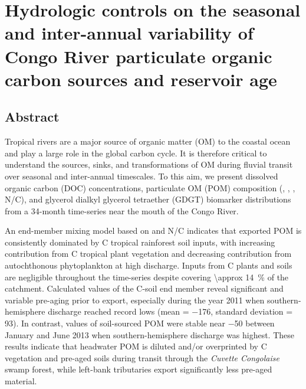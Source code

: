 \chapter{Hydrologic controls on the seasonal and inter-annual variability of Congo River particulate organic carbon sources and reservoir age}
\label{Ch5}
\raggedbottom

{\let\thefootnote\relax{}}

\clearpage

\section{Abstract}

Tropical rivers are a major source of organic matter (OM) to the coastal ocean and play a large role in the global carbon cycle. It is therefore critical to understand the sources, sinks, and transformations of OM during fluvial transit over seasonal and inter-annual timescales. To this aim, we present dissolved organic carbon (DOC) concentrations, particulate OM (POM) composition (, , , N/C), and glycerol dialkyl glycerol tetraether (GDGT) biomarker distributions from a 34-month time-series near the mouth of the Congo River.

An end-member mixing model based on  and N/C indicates that exported POM is consistently dominated by C tropical rainforest soil inputs, with increasing contribution from C tropical plant vegetation and decreasing contribution from autochthonous phytoplankton at high discharge. Inputs from C plants and soils are negligible throughout the time-series despite covering \SI{\approx 14}{\%} of the catchment. Calculated  values of the C-soil end member reveal significant and variable pre-aging prior to export, especially during the year 2011 when southern-hemisphere discharge reached record lows (mean  = \SI{-176}{\permil}, standard deviation = \SI{93}{\permil}). In contrast,  values of soil-sourced POM were stable near \SI{-50}{\permil} between January and June 2013 when southern-hemisphere discharge was highest. These results indicate that headwater POM is diluted and/or overprinted by C vegetation and pre-aged soils during transit through the \textit{Cuvette Congolaise} swamp forest, while left-bank tributaries export significantly less pre-aged material.


